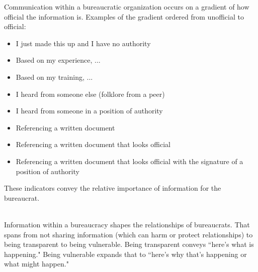 Communication within a bureaucratic organization occurs on a gradient of how official the information is. Examples of the gradient ordered from unofficial to official:
\begin{itemize}
    \item I just made this up and I have no authority
    \item Based on my experience, ...
    \item Based on my training, ...
    \item I heard from someone else (folklore from a peer)
    \item I heard from someone in a position of authority
    \item Referencing a written document
    \item Referencing a written document that looks official
    \item Referencing a written document that looks official with the signature of a position of authority
\end{itemize}
These indicators convey the relative importance of information for the bureaucrat. 

\ \\

Information within a bureaucracy shapes the relationships of bureaucrats. That spans from not sharing information (which can harm or protect relationships) to being transparent to being vulnerable.  
Being transparent conveys ``here's what is happening." Being vulnerable expands that to ``here's why that's happening or what might happen."

\ \\